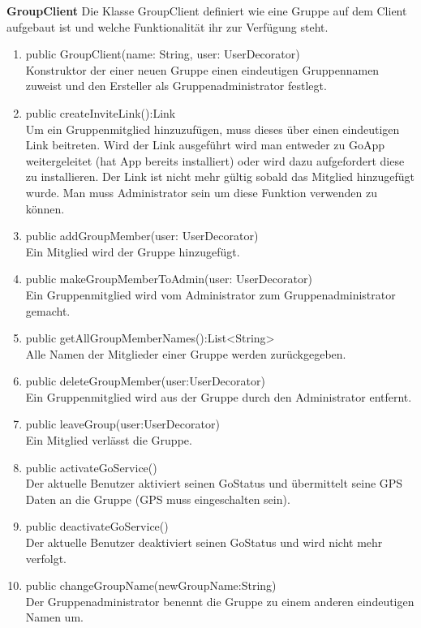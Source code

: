 \textbf{GroupClient}
Die Klasse GroupClient definiert wie eine Gruppe auf dem Client aufgebaut ist und welche Funktionalität ihr zur Verfügung steht.
\begin{enumerate}
	\item public GroupClient(name: String, user: UserDecorator)\\
		Konstruktor der einer neuen Gruppe einen eindeutigen Gruppennamen zuweist und den Ersteller als Gruppenadministrator festlegt.
	\item public createInviteLink():Link\\
		Um ein Gruppenmitglied hinzuzufügen, muss dieses über einen eindeutigen Link beitreten. Wird der Link ausgeführt wird man entweder zu GoApp weitergeleitet (hat App bereits installiert) oder wird dazu aufgefordert diese zu installieren. Der Link ist nicht mehr gültig sobald das Mitglied hinzugefügt wurde. Man muss Administrator sein um diese Funktion verwenden zu können.
	\item public addGroupMember(user: UserDecorator)\\
		Ein Mitglied wird der Gruppe hinzugefügt.
	\item public makeGroupMemberToAdmin(user: UserDecorator)\\
		Ein Gruppenmitglied wird vom Administrator zum Gruppenadministrator gemacht.
	\item public getAllGroupMemberNames():List<String>\\
		Alle Namen der Mitglieder einer Gruppe werden zurückgegeben.
	\item public deleteGroupMember(user:UserDecorator)\\
		Ein Gruppenmitglied wird aus der Gruppe durch den Administrator entfernt.
	\item public leaveGroup(user:UserDecorator)\\
		Ein Mitglied verlässt die Gruppe.
	\item public activateGoService()\\
		Der aktuelle Benutzer aktiviert seinen GoStatus und übermittelt seine GPS Daten an die Gruppe (GPS muss eingeschalten sein).
	\item public deactivateGoService()\\
		Der aktuelle Benutzer deaktiviert seinen GoStatus und wird nicht mehr verfolgt.
	\item public changeGroupName(newGroupName:String)\\
		Der Gruppenadministrator benennt die Gruppe zu einem anderen eindeutigen Namen um.

\end{enumerate}

